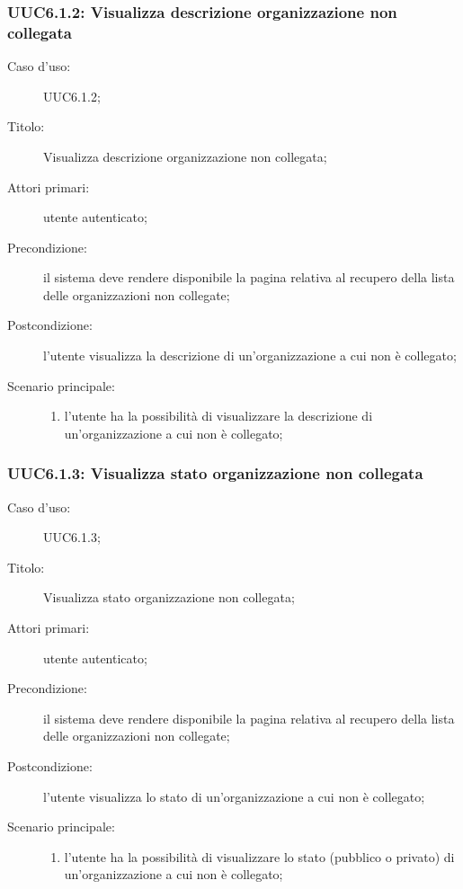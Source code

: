 \documentclass[../../../analisi-dei-requisiti.tex]{subfiles}
\begin{document}
\subsubsection{UUC6.1.2: Visualizza descrizione organizzazione non collegata}%
\label{subs:UUC6.1.2}
\begin{description}
  \item[Caso d'uso:] UUC6.1.2;
  \item[Titolo:] Visualizza descrizione organizzazione non collegata;
  \item[Attori primari:] utente autenticato;
  \item[Precondizione:] il sistema deve rendere disponibile la pagina relativa al recupero della lista delle organizzazioni non collegate;
  \item[Postcondizione:] l'utente visualizza la descrizione di un'organizzazione a cui non è collegato;
  \item[Scenario principale:]
        \begin{enumerate}
          \item l'utente ha la possibilità di visualizzare la descrizione di un'organizzazione a cui non è collegato;
        \end{enumerate}
\end{description}

\subsubsection{UUC6.1.3: Visualizza stato organizzazione non collegata}%
\label{subs:UUC6.1.3}
\begin{description}
  \item[Caso d'uso:] UUC6.1.3;
  \item[Titolo:] Visualizza stato organizzazione non collegata;
  \item[Attori primari:] utente autenticato;
  \item[Precondizione:] il sistema deve rendere disponibile la pagina relativa al recupero della lista delle organizzazioni non collegate;
  \item[Postcondizione:] l'utente visualizza lo stato di un'organizzazione a cui non è collegato;
  \item[Scenario principale:]
        \begin{enumerate}
          \item l'utente ha la possibilità di visualizzare lo stato (pubblico o privato) di un'organizzazione a cui non è collegato;
        \end{enumerate}
\end{description}
\end{document}
